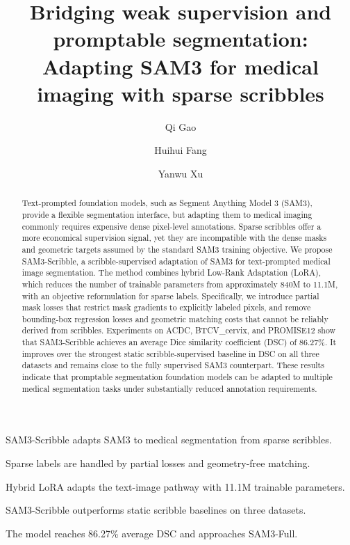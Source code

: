 \documentclass[preprint,12pt]{elsarticle}
\begin{document}
\begin{frontmatter}

\title{Bridging weak supervision and promptable segmentation: Adapting SAM3 for medical imaging with sparse scribbles}

\author[inst1,inst2]{Qi Gao}
\author[inst1,inst2]{Huihui Fang}
\author[inst1,inst2]{Yanwu Xu}




\begin{abstract}
Text-prompted foundation models, such as Segment Anything Model 3 (SAM3), provide a flexible segmentation interface, but adapting them to medical imaging commonly requires expensive dense pixel-level annotations. Sparse scribbles offer a more economical supervision signal, yet they are incompatible with the dense masks and geometric targets assumed by the standard SAM3 training objective. We propose SAM3-Scribble, a scribble-supervised adaptation of SAM3 for text-prompted medical image segmentation. The method combines hybrid Low-Rank Adaptation (LoRA), which reduces the number of trainable parameters from approximately 840M to 11.1M, with an objective reformulation for sparse labels. Specifically, we introduce partial mask losses that restrict mask gradients to explicitly labeled pixels, and remove bounding-box regression losses and geometric matching costs that cannot be reliably derived from scribbles. Experiments on ACDC, BTCV\_cervix, and PROMISE12 show that SAM3-Scribble achieves an average Dice similarity coefficient (DSC) of 86.27\%. It improves over the strongest static scribble-supervised baseline in DSC on all three datasets and remains close to the fully supervised SAM3 counterpart. These results indicate that promptable segmentation foundation models can be adapted to multiple medical segmentation tasks under substantially reduced annotation requirements.
\end{abstract}

\begin{highlights}
\item SAM3-Scribble adapts SAM3 to medical segmentation from sparse scribbles.
\item Sparse labels are handled by partial losses and geometry-free matching.
\item Hybrid LoRA adapts the text-image pathway with 11.1M trainable parameters.
\item SAM3-Scribble outperforms static scribble baselines on three datasets.
\item The model reaches 86.27\% average DSC and approaches SAM3-Full.
\end{highlights}


\end{frontmatter}
\end{document}
